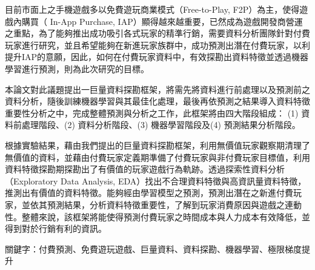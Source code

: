目前市面上之手機遊戲多以免費遊玩商業模式（Free-to-Play, F2P）為主，使得遊戲內購買（ In-App Purchase, IAP）顯得越來越重要，已然成為遊戲開發商營運之重點，為了能夠推出成功吸引各式玩家的精準行銷，需要資料分析團隊針對付費玩家進行研究，並且希望能夠在新進玩家族群中，成功預測出潛在付費玩家，以利提升IAP的意願，因此，如何在付費玩家資料中，有效探勘出資料特徵並透過機器學習進行預測，則為此次研究的目標。

本論文對此議題提出一巨量資料探勘框架，將需先將資料進行前處理以及預測前之資料分析，隨後訓練機器學習與其最佳化處理，最後再依預測之結果導入資料特徵重要性分析之中，完成整體預測與分析之工作，此框架將由四大階段組成： (1) 資料前處理階段、(2) 資料分析階段、(3) 機器學習階段及(4) 預測結果分析階段。

根據實驗結果，藉由我們提出的巨量資料探勘框架，利用無價值玩家觀察期清理了無價值的資料，並藉由付費玩家定義期準備了付費玩家與非付費玩家目標值，利用資料特徵探勘期探勘出了有價值的玩家遊戲行為軌跡。透過探索性資料分析（Exploratory Data Analysis, EDA）找出不合理資料特徵與高資訊量資料特徵，推測出有價值的資料特徵。能夠經由學習模型之預測，預測出潛在之新進付費玩家，並依其預測結果，分析資料特徵重要性，了解到玩家消費原因與遊戲之連動性。整體來說，該框架將能使得預測付費玩家之時間成本與人力成本有效降低，並得到對於行銷有利的資訊。

關鍵字：付費預測、免費遊玩遊戲、巨量資料、資料探勘、機器學習、極限梯度提升